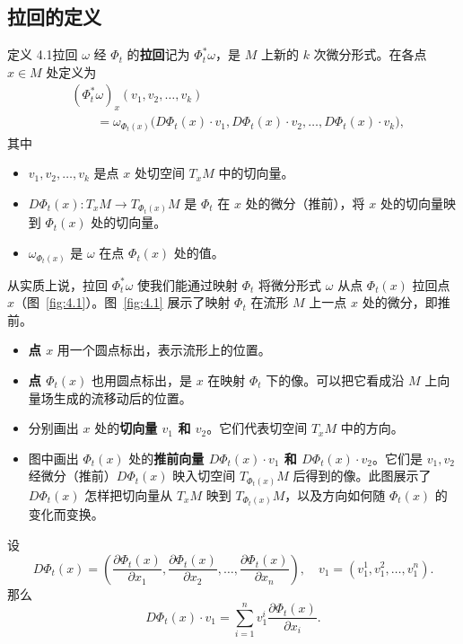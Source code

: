 \subsection{拉回的定义}
\begin{statement}{定义 4.1}{拉回}
$\omega$ 经 $\Phi_t$ 的\textbf{拉回}记为 $\Phi_t^*\omega$，是 $M$ 上新的 $k$ 次微分形式。在各点 $x\in M$ 处定义为
\[
  \begin{aligned}
    &(\Phi_t^*\omega)_x(v_1,v_2,\ldots,v_k)\\
    &\qquad=\omega_{\Phi_t(x)}
       \bigl(D\Phi_t(x)\cdot v_1,D\Phi_t(x)\cdot v_2,\ldots,D\Phi_t(x)\cdot v_k\bigr),
  \end{aligned}
\]
其中
\begin{itemize}
  \item $v_1,v_2,\ldots,v_k$ 是点 $x$ 处切空间 $T_xM$ 中的切向量。
  \item $D\Phi_t(x)\colon T_xM\to T_{\Phi_t(x)}M$ 是 $\Phi_t$ 在 $x$ 处的微分（推前），将 $x$ 处的切向量映到 $\Phi_t(x)$ 处的切向量。
  \item $\omega_{\Phi_t(x)}$ 是 $\omega$ 在点 $\Phi_t(x)$ 处的值。
\end{itemize}

从实质上说，拉回 $\Phi_t^*\omega$ 使我们能通过映射 $\Phi_t$ 将微分形式 $\omega$ 从点 $\Phi_t(x)$ 拉回点 $x$（图~\ref{fig:4.1}）。图~\ref{fig:4.1} 展示了映射 $\Phi_t$ 在流形 $M$ 上一点 $x$ 处的微分，即推前。
\begin{figure}[htbp]
  \centering
  
\end{figure}

\begin{itemize}
  \item \textbf{点 $x$} 用一个圆点标出，表示流形上的位置。
  \item \textbf{点 $\Phi_t(x)$} 也用圆点标出，是 $x$ 在映射 $\Phi_t$ 下的像。可以把它看成沿 $M$ 上向量场生成的流移动后的位置。
  \item 分别画出 $x$ 处的\textbf{切向量 $v_1$ 和 $v_2$}。它们代表切空间 $T_xM$ 中的方向。
  \item 图中画出 $\Phi_t(x)$ 处的\textbf{推前向量 $D\Phi_t(x)\cdot v_1$ 和 $D\Phi_t(x)\cdot v_2$}。它们是 $v_1,v_2$ 经微分（推前）$D\Phi_t(x)$ 映入切空间 $T_{\Phi_t(x)}M$ 后得到的像。此图展示了 $D\Phi_t(x)$ 怎样把切向量从 $T_xM$ 映到 $T_{\Phi_t(x)}M$，以及方向如何随 $\Phi_t(x)$ 的变化而变换。
\end{itemize}
设
\[
  D\Phi_t(x)=\left(\frac{\partial\Phi_t(x)}{\partial x_1},
  \frac{\partial\Phi_t(x)}{\partial x_2},\ldots,
  \frac{\partial\Phi_t(x)}{\partial x_n}\right),
  \quad v_1=(v_1^1,v_1^2,\ldots,v_1^n).
\]
那么
\[
  D\Phi_t(x)\cdot v_1=\sum_{i=1}^n v_1^i\frac{\partial\Phi_t(x)}{\partial x_i}.
\]
\end{statement}

